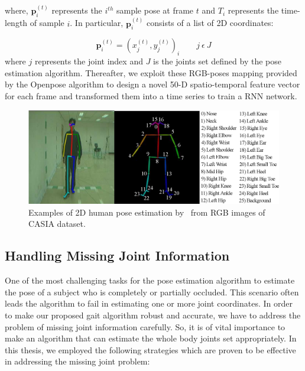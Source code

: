 where, $\mathbf{p}_i^{(t)}$ represents the ${i}^{th}$ sample pose at frame $ t $ and $T_i$ represents the time-length of sample $i$. In particular, $\mathbf{p}_i^{(t)}$ consists of a list of 2D coordinates:

\begin{equation}
\mathbf{p}_{i}^{(t)} ={(x_j^{(t)}, y_j^{(t)})_{i}} \qquad j~\epsilon~J
\end{equation}
where $j$ represents the joint index and $J$ is the joints set defined by the pose estimation algorithm. Thereafter, we exploit these RGB-poses mapping provided by the Openpose algorithm to design a novel 50-D spatio-temporal feature vector for each frame and transformed them into a time series to train a RNN network.


\begin{figure}
	\centering 
	\includegraphics[width = \textwidth]{figures/pose_estimation.eps}
	\caption[Examples of 2D human pose estimation from RGB images of CASIA dataset]
	{Examples of 2D human pose estimation by~\cite{Cao_19} from RGB images of CASIA dataset. \label{fig:pose_estimation}}
\end{figure}


\subsection{Handling Missing Joint Information}
One of the most challenging tasks for the pose estimation algorithm to estimate the pose of a subject who is completely or partially occluded. This scenario often leads the algorithm to fail in estimating one or more joint coordinates. In order to make our proposed gait algorithm robust and accurate, we have to address the problem of missing joint information carefully. So, it is of vital importance to make an algorithm that can estimate the whole body joints set appropriately. In this thesis, we employed the following strategies which are proven to be effective in addressing the missing joint problem:


